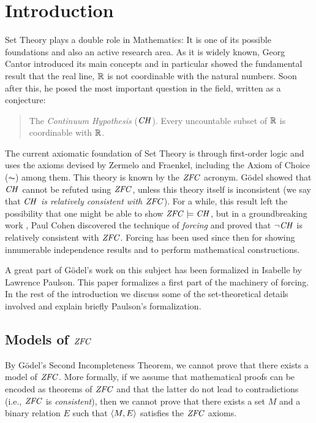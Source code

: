 \section{Introduction}\label{sec:introduction}
Set Theory plays a double role in Mathematics: It is one of its
possible foundations and also an active research area.
%
As it is widely known, Georg Cantor introduced its main concepts and in
particular showed the fundamental result that the real line, $\mathbb{R}$  is not
coordinable with the natural numbers. Soon after this, he posed the
most important question in the field, written as a conjecture:
\begin{quote}
  The \emph{Continuum Hypothesis} ($\mathit{CH}$). Every uncountable subset of $\mathbb{R}$ is
  coordinable with $\mathbb{R}$.
\end{quote}

The current axiomatic foundation of Set Theory is through first-order
logic and uses the axioms devised by Zermelo and Fraenkel, including
the Axiom of Choice ($\AC$) among them. This theory is known by the
$\mathit{ZFC}$ acronym. G\"odel \cite{godel-L} showed that $\mathit{CH}$ cannot be refuted using
$\mathit{ZFC}$, unless this theory itself is inconsistent (we say that
\emph{$\mathit{CH}$ is relatively consistent with $\mathit{ZFC}$}). For a while, this
result left the possibility that one might be able to show
$\mathit{ZFC}\models \mathit{CH}$, but in a groundbreaking work \cite{Cohen-CH-PNAS},
Paul Cohen discovered the technique of \emph{forcing} and proved that
$\neg\mathit{CH}$ is relatively consistent with $\mathit{ZFC}$. Forcing has been used
since then for showing innumerable independence results and to perform
mathematical constructions.

A great part of G\"odel's work on this subject has been formalized in
Isabelle by Lawrence Paulson. This paper formalizes a first part of the
machinery of forcing. In the rest of the introduction we discuss some
of the set-theoretical details involved and explain briefly Paulson's
formalization.

\subsection{Models of $\mathit{ZFC}$}
By G\"odel's Second Incompleteness Theorem, we cannot  prove that
there exists a model of $\mathit{ZFC}$. More formally, if we assume that
mathematical proofs can be encoded as theorems of $\mathit{ZFC}$ and that
the latter do not lead to contradictions (i.e., $\mathit{ZFC}$ is
\emph{consistent}), then we cannot prove that there exists a set $M$
and a binary relation $E$ such that $\langle M,E\rangle$ satisfies the $\mathit{ZFC}$
axioms.

